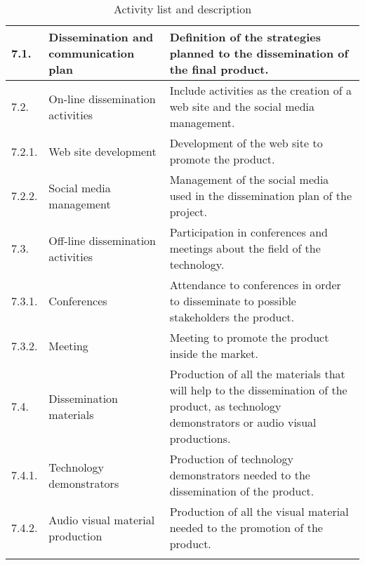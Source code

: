 \begin{longtable}[H]{l >{\raggedright\arraybackslash}p{4cm} p{8cm}}
	7.1. & Dissemination and communication plan & Definition of the strategies planned to the dissemination of the final product.\vspace{0.2cm} \\
	
	\midrule
	
	7.2. & On-line dissemination activities & Include activities as the creation of a web site and the social media management.\vspace{0.2cm} \\
	
	\midrule
	
	7.2.1. & Web site development & Development of the web site to promote the product.\vspace{0.2cm} \\
	
	\midrule
	
	7.2.2. & Social media management & Management of the social media used in the dissemination plan of the project.\vspace{0.2cm} \\
	
	\midrule
	
	7.3. & Off-line dissemination activities & Participation in conferences and meetings about the field of the technology.\vspace{0.2cm} \\
	
	\midrule
	
	7.3.1. & Conferences & Attendance to conferences in order to disseminate to possible stakeholders the product.\vspace{0.2cm} \\
	
	\midrule
	
	7.3.2. & Meeting & Meeting to promote the product inside the market.\vspace{0.2cm} \\
	
	\midrule
	
	7.4. & Dissemination materials & Production of all the materials that will help to the dissemination of the product, as technology demonstrators or audio visual productions.\vspace{0.2cm} \\
	
	\midrule
	
	7.4.1. & Technology demonstrators & Production of technology demonstrators needed to the dissemination of the product.\vspace{0.2cm} \\
	
	\midrule
	
	7.4.2. & Audio visual material production & Production of all the visual material needed to the promotion of the product.\vspace{0.2cm} \\
	
	\bottomrule[2pt]
	
	\caption{Activity list and description}
\end{longtable}